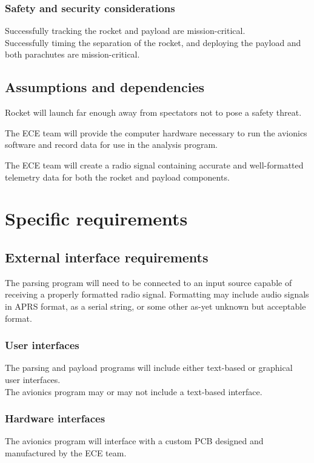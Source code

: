 \documentclass[onecolumn, draftclsnofoot, 10pt, compsoc]{IEEEtran}
\begin{document}
\subsubsection{Safety and security considerations}
Successfully tracking the rocket and payload are mission-critical.\\
Successfully timing the separation of the rocket, and deploying the payload and both parachutes are mission-critical.

\subsection{Assumptions and dependencies}
Rocket will launch far enough away from spectators not to pose a safety threat.

The ECE team will provide the computer hardware necessary to run the avionics software and record data for use in the analysis program.

The ECE team will create a radio signal containing accurate and well-formatted telemetry data for both the rocket and payload components.

\section{Specific requirements}
\subsection{External interface requirements}
The parsing program will need to be connected to an input source capable of receiving a properly formatted radio signal.  Formatting may include audio signals in APRS format, as a serial string, or some other as-yet unknown but acceptable format.

\subsubsection{User interfaces}
The parsing and payload programs will include either text-based or graphical user interfaces.\\
The avionics program may or may not include a text-based interface.

\subsubsection{Hardware interfaces}
The avionics program will interface with a custom PCB designed and manufactured by the ECE team.
	
\end{document}

